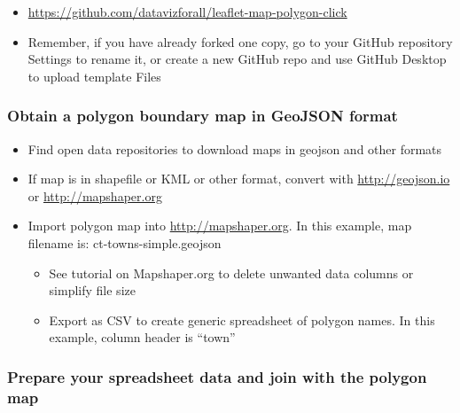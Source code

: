 \documentclass[
  english,
]{book}
\providecommand{\tightlist}{%
  \setlength{\itemsep}{0pt}\setlength{\parskip}{0pt}}
\begin{document}
\begin{itemize}
\tightlist
\item
  \url{https://github.com/datavizforall/leaflet-map-polygon-click}
\item
  Remember, if you have already forked one copy, go to your GitHub repository Settings to rename it, or create a new GitHub repo and use GitHub Desktop to upload template Files
\end{itemize}

\hypertarget{obtain-a-polygon-boundary-map-in-geojson-format}{%
\subsubsection*{Obtain a polygon boundary map in GeoJSON format}\label{obtain-a-polygon-boundary-map-in-geojson-format}}

\begin{itemize}
\tightlist
\item
  Find open data repositories to download maps in geojson and other formats
\item
  If map is in shapefile or KML or other format, convert with \url{http://geojson.io} or \url{http://mapshaper.org}
\item
  Import polygon map into \url{http://mapshaper.org}. In this example, map filename is: ct-towns-simple.geojson

  \begin{itemize}
  \tightlist
  \item
    See tutorial on Mapshaper.org to delete unwanted data columns or simplify file size
  \item
    Export as CSV to create generic spreadsheet of polygon names. In this example, column header is ``town''
  \end{itemize}
\end{itemize}

\hypertarget{prepare-your-spreadsheet-data-and-join-with-the-polygon-map}{%
\subsubsection*{Prepare your spreadsheet data and join with the polygon map}\label{prepare-your-spreadsheet-data-and-join-with-the-polygon-map}}
\end{document}
